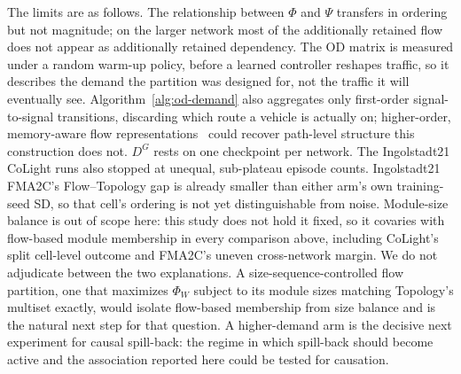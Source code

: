 \documentclass[journal]{IEEEtran}
\theoremstyle{definition}
\begin{document}
The limits are as follows.
The relationship between $\Phi$ and $\Psi$ transfers in ordering but not magnitude; on the larger network most of the additionally retained flow does not appear as additionally retained dependency.
The OD matrix is measured under a random warm-up policy, before a learned controller reshapes traffic, so it describes the demand the partition was designed for, not the traffic it will eventually see. Algorithm~\ref{alg:od-demand} also aggregates only first-order signal-to-signal transitions, discarding which route a vehicle is actually on; higher-order, memory-aware flow representations~\citep{rosvall2014memory} could recover path-level structure this construction does not. $D^G$ rests on one checkpoint per network.
The Ingolstadt21 CoLight runs also stopped at unequal, sub-plateau episode counts.
Ingolstadt21 FMA2C's Flow--Topology gap is already smaller than either arm's own training-seed SD, so that cell's ordering is not yet distinguishable from noise.
Module-size balance is out of scope here: this study does not hold it fixed, so it covaries with flow-based module membership in every comparison above, including CoLight's split cell-level outcome and FMA2C's uneven cross-network margin. We do not adjudicate between the two explanations. A size-sequence-controlled flow partition, one that maximizes $\Phi_W$ subject to its module sizes matching Topology's multiset exactly, would isolate flow-based membership from size balance and is the natural next step for that question.
A higher-demand arm is the decisive next experiment for causal spill-back: the regime in which spill-back should become active and the association reported here could be tested for causation.
\end{document}

